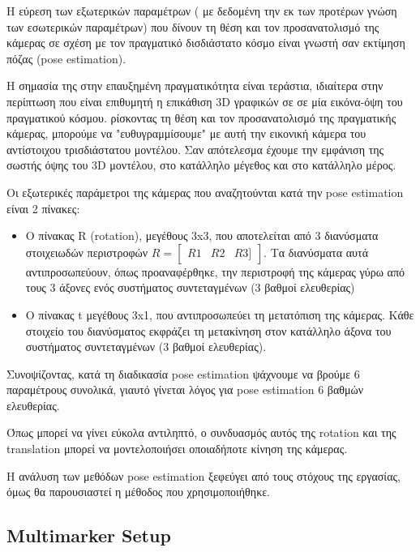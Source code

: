 Η εύρεση των εξωτερικών παραμέτρων ( με δεδομένη την εκ των προτέρων γνώση των εσωτερικών παραμέτρων) που δίνουν τη θέση και τον προσανατολισμό της κάμερας σε σχέση με τον πραγματικό δισδιάστατο κόσμο είναι γνωστή σαν εκτίμηση πόζας (pose estimation).

H σημασία της στην επαυξημένη πραγματικότητα είναι τεράστια, ιδιαίτερα στην περίπτωση που είναι επιθυμητή η επικάθιση 3D γραφικών σε σε μία εικόνα-όψη του πραγματικού κόσμου. ρίσκοντας τη θέση και τον προσανατολισμό της πραγματικής κάμερας, μπορούμε να "ευθυγραμμίσουμε" με αυτή την εικονική κάμερα του αντίστοιχου τρισδιάστατου μοντέλου. Σαν απότελεσμα έχουμε την εμφάνιση της σωστής όψης του 3D μοντέλου, στο κατάλληλο μέγεθος και στο κατάλληλο μέρος.

Οι εξωτερικές παράμετροι της κάμερας που αναζητούνται κατά την pose estimation είναι 2 πίνακες:

\begin{itemize}
\item Ο πίνακας R (rotation), μεγέθους 3x3, που αποτελείται από 3 διανύσματα στοιχειωδών περιστροφών $R=\begin{bmatrix} R1 & R2 & R3 ] \end{bmatrix}$. Τα διανύσματα αυτά αντιπροσωπεύουν, όπως προαναφέρθηκε, την περιστροφή της κάμερας γύρω από τους 3 άξονες ενός συστήματος συντεταγμένων (3 βαθμοί ελευθερίας)
\item Ο πίνακας t μεγέθους 3x1, που αντιπροσωπεύει τη μετατόπιση της κάμερας. Κάθε στοιχείο του διανύσματος εκφράζει τη μετακίνηση στον κατάλληλο άξονα του συστήματος συντεταγμένων (3 βαθμοί ελευθερίας).
\end{itemize}


Συνοψίζοντας, κατά τη διαδικασία pose estimation ψάχνουμε να βρούμε 6 παραμέτρους συνολικά, γιαυτό γίνεται λόγος για pose estimation 6 βαθμών ελευθερίας.

Όπως μπορεί να γίνει εύκολα αντιληπτό, ο συνδυασμός αυτός της rotation και της translation μπορεί να μοντελοποιήσει οποιαδήποτε κίνηση της κάμερας.


Η ανάλυση των μεθόδων pose estimation ξεφεύγει από τους στόχους της εργασίας, όμως θα παρουσιαστεί η μέθοδος που χρησιμοποιήθηκε.



\subsection{Multimarker Setup}




